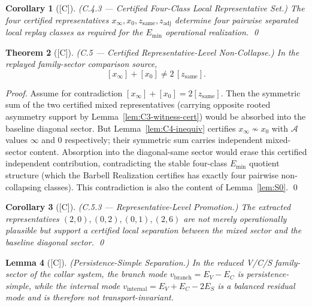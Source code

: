 \documentclass[12pt,oneside]{amsbook}
\theoremstyle{plain}
\newtheorem{theorem}{Theorem}[section]
\newtheorem{lemma}[theorem]{Lemma}
\newtheorem{corollary}[theorem]{Corollary}
\theoremstyle{definition}
\theoremstyle{remark}
\newcommand{\status}[1]{\textup{[#1]}}
\begin{document}
\begin{corollary}[\status{C}]\label{cor:C4-four-class}
\textup{(C.4.3 --- Certified Four-Class Local Representative Set.)}
The four certified representatives
$x_\infty, x_0, z_{\mathrm{same}}, z_{\mathrm{adj}}$
determine four pairwise separated local replay classes as required for
the $E_{\min}$ operational realization. \qed
\end{corollary}

\begin{theorem}[\status{C}]\label{thm:C5-noncollapse}
\textup{(C.5 --- Certified Representative-Level Non-Collapse.)}
In the replayed family-sector comparison source,
\[
  [x_\infty] + [x_0] \neq 2\,[z_{\mathrm{same}}].
\]
\end{theorem}

\begin{proof}
Assume for contradiction $[x_\infty] + [x_0] = 2[z_{\mathrm{same}}]$.
Then the symmetric sum of the two certified mixed representatives
(carrying opposite rooted asymmetry support by
Lemma~\ref{lem:C3-witness-cert}) would be absorbed into the baseline
diagonal sector.  But Lemma~\ref{lem:C4-inequiv} certifies
$x_\infty \not\sim x_0$ with $\mathcal{A}$ values $\infty$ and $0$
respectively; their symmetric sum carries independent mixed-sector
content.  Absorption into the diagonal-same sector would erase this
certified independent contribution, contradicting the stable
four-class $E_{\min}$ quotient structure (which the Barbell
Realization certifies has exactly four pairwise non-collapsing
classes).  This contradiction is also the content of
Lemma~\ref{lem:S0}. \qed
\end{proof}

\begin{corollary}[\status{C}]\label{cor:C5-promo}
\textup{(C.5.3 --- Representative-Level Promotion.)}
The extracted representatives $(2,0), (0,2), (0,1), (2,6)$ are not
merely operationally plausible but support a certified local
separation between the mixed sector and the baseline diagonal sector. \qed
\end{corollary}

\begin{lemma}[\status{C}]\label{lem:persistence-simple-separation}
\textup{(Persistence-Simple Separation.)}
In the reduced V/C/S family-sector of the collar system, the branch
mode $v_{\mathrm{branch}} = E_V - E_C$ is persistence-simple, while
the internal mode $v_{\mathrm{internal}} = E_V + E_C - 2E_S$ is a
balanced residual mode and is therefore not transport-invariant.
\end{lemma}
\end{document}
